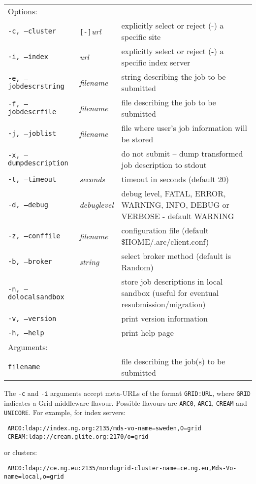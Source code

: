 \hspace*{0.5cm}
\begin{shaded}
\end{shaded}
\begin{longtable}{llp{8cm}}
   Options:&&\\
   \texttt{-c, --cluster}&\verb#[-]#\textit{url}&explicitly select or reject (-) a specific site\\
   \texttt{-i, --index}&\textit{url}&explicitly select or reject (-) a specific index server\\
   \texttt{-e, --jobdescrstring}&\textit{filename}&string describing the job to be submitted\\
   \texttt{-f, --jobdescrfile}&\textit{filename}&file describing the job to be submitted\\
   \texttt{-j, --joblist}&\textit{filename}&file where user's job information will be stored\\
   \texttt{-x, --dumpdescription}&&do not submit -- dump transformed job description to stdout\\
   \texttt{-t, --timeout}&\textit{seconds}&timeout in seconds (default 20)\\
   \texttt{-d, --debug}&\textit{debuglevel}&debug level, FATAL, ERROR, WARNING, INFO, DEBUG or VERBOSE - default WARNING\\
   \texttt{-z, --conffile}&\textit{filename}& configuration file (default {\$}HOME/.arc/client.conf)\\
   \texttt{-b, --broker}&\textit{string}&select broker method (default is Random)\\
   \texttt{-n, --dolocalsandbox}& &store job descriptions in local sandbox (useful for eventual resubmission/migration)\\
   \texttt{-v, --version}&&print version information\\
   \texttt{-h, --help}&&print help page\\
   Arguments:&&\\
   \texttt{filename}&&file describing the job(s) to be submitted\\
\end{longtable}

\begin{framed}
The \verb#-c# and \verb#-i# arguments accept meta-URLs of the format \texttt{GRID:URL}, where \texttt{GRID} indicates a Grid middleware flavour. Possible flavours are \texttt{ARC0}, \texttt{ARC1}, \texttt{CREAM} and \texttt{UNICORE}. For example, for index servers:
\begin{verbatim}
 ARC0:ldap://index.ng.org:2135/mds-vo-name=sweden,O=grid
 CREAM:ldap://cream.glite.org:2170/o=grid
\end{verbatim}
or clusters:

\verb# ARC0:ldap://ce.ng.eu:2135/nordugrid-cluster-name=ce.ng.eu,Mds-Vo-name=local,o=grid#
\end{framed}

